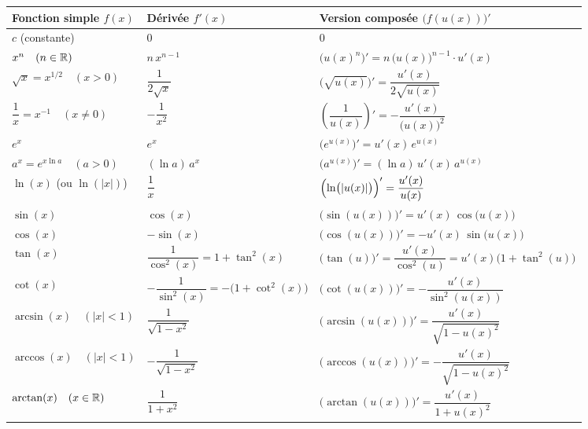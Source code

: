 \begin{theoreme}
\begin{center}
{\small
\renewcommand{\arraystretch}{1.55}
\setlength{\tabcolsep}{4pt}
\begin{tabular}{@{}lll@{}}
\toprule
\textbf{Fonction simple $f(x)$} & \textbf{Dérivée $f'(x)$} & \textbf{Version composée $\bigl(f(u(x))\bigr)'$} \\
\midrule
$c$ (constante) & $0$ & $0$ \\
$x^n \quad (n \in \mathbb{R})$ & $n\,x^{n-1}$ & $\bigl(u(x)^n\bigr)' = n\,\bigl(u(x)\bigr)^{n-1} \cdot u'(x)$ \\
$\sqrt{x} = x^{1/2} \quad (x > 0)$ & $\dfrac{1}{2\sqrt{x}}$ & $\bigl(\sqrt{u(x)}\bigr)' = \dfrac{u'(x)}{2\sqrt{u(x)}}$ \\
$\dfrac{1}{x} = x^{-1} \quad (x \neq 0)$ & $-\dfrac{1}{x^2}$ & $\left(\dfrac{1}{u(x)}\right)' = -\dfrac{u'(x)}{\bigl(u(x)\bigr)^2}$ \\
$e^x$ & $e^x$ & $\bigl(e^{u(x)}\bigr)' = u'(x)\,e^{u(x)}$ \\
$a^x = e^{x\ln a} \quad (a > 0)$ & $(\ln a)\,a^x$ & $\bigl(a^{u(x)}\bigr)' = (\ln a)\,u'(x)\,a^{u(x)}$ \\
$\ln(x)$ (ou $\ln(|x|)$) & $\dfrac{1}{x}$ & $\Bigl(\ln\bigl(|u(x)|\bigr)\Bigr)' = \dfrac{u'(x)}{u(x)}$ \\
$\sin(x)$ & $\cos(x)$ & $\bigl(\sin(u(x))\bigr)' = u'(x)\,\cos\bigl(u(x)\bigr)$ \\
$\cos(x)$ & $-\sin(x)$ & $\bigl(\cos(u(x))\bigr)' = -u'(x)\,\sin\bigl(u(x)\bigr)$ \\
$\tan(x)$ & $\dfrac{1}{\cos^2(x)} = 1 + \tan^2(x)$ & $\bigl(\tan(u)\bigr)' = \dfrac{u'(x)}{\cos^2(u)} = u'(x)\bigl(1+\tan^2(u)\bigr)$ \\
$\cot(x)$ & $-\dfrac{1}{\sin^2(x)} = -\bigl(1 + \cot^2(x)\bigr)$ & $\bigl(\cot(u(x))\bigr)' = -\dfrac{u'(x)}{\sin^2(u(x))}$ \\
$\arcsin(x) \quad (|x| < 1)$ & $\dfrac{1}{\sqrt{1 - x^2}}$ & $\bigl(\arcsin(u(x))\bigr)' = \dfrac{u'(x)}{\sqrt{1 - u(x)^2}}$ \\
$\arccos(x) \quad (|x| < 1)$ & $-\dfrac{1}{\sqrt{1 - x^2}}$ & $\bigl(\arccos(u(x))\bigr)' = -\dfrac{u'(x)}{\sqrt{1 - u(x)^2}}$ \\
$\arctan(x) \quad (x \in \mathbb{R})$ & $\dfrac{1}{1 + x^2}$ & $\bigl(\arctan(u(x))\bigr)' = \dfrac{u'(x)}{1 + u(x)^2}$ \\
\bottomrule
\end{tabular}
}
\end{center}
\end{theoreme}

